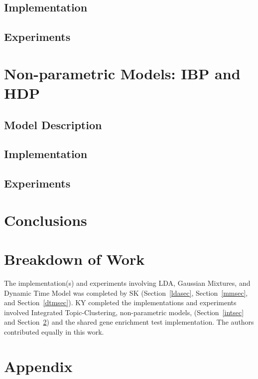 \documentclass{article}
\begin{document}
\subsection{Implementation} 
\subsection{Experiments} 


\section{Non-parametric Models: IBP and HDP} 
\label{nonparametricsec}
\subsection{Model Description} 
\subsection{Implementation} 
\subsection{Experiments} 

\section{Conclusions} 
\label{nonparametricsec}


\section{Breakdown of Work}
The implementation(s) and experiments involving LDA, Gaussian Mixtures, and Dynamic Time Model was completed by SK (Section~\ref{ldasec}, Section~\ref{mmsec}, and Section~\ref{dtmsec}). KY completed the implementations and experiments involved Integrated Topic-Clustering, non-parametric models, (Section~\ref{intsec} and Section~\ref{nonparametricsec}) and the shared gene enrichment test implementation. The authors contributed equally in this work.




\newpage

\section{Appendix} 
\end{document}
